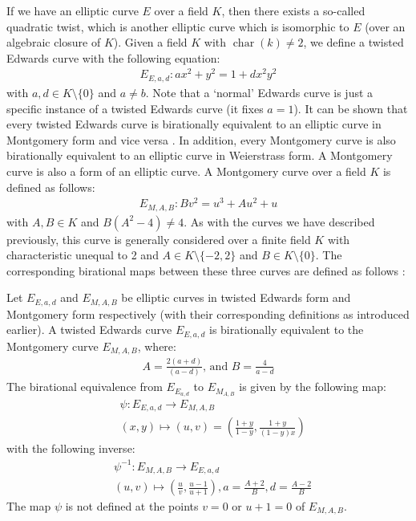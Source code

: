 If we have an elliptic curve $E$ over a field $K$, then there exists a so-called quadratic twist, which is another elliptic curve which is isomorphic to $E$ (over an algebraic closure of $K$).
Given a field $K$ with $\operatorname{char}(k) \neq 2$, we define a twisted Edwards curve with the following equation:
%
\begin{align*}
E_{E,a,d} : ax^2 + y^2 = 1 + dx^2y^2
\end{align*}
%
with $a,d \in K \setminus \{0\}$ and $a \neq b$.
Note that a `normal' Edwards curve is just a specific instance of a twisted Edwards curve (it fixes $a = 1$). 
It can be shown that every twisted Edwards curve is birationally equivalent to an elliptic curve in Montgomery form and vice versa \cite{bern2008twisted}.
In addition, every Montgomery curve is also birationally equivalent to an elliptic curve in Weierstrass form.
A Montgomery curve is also a form of an elliptic curve. 
A Montgomery curve over a field $K$ is defined as follows:
%
\begin{align*}
E_{M, A, B} : Bv^2 = u^3 + Au^2 + u
\end{align*}
%
with $A, B \in K$ and $B(A^2 - 4) \neq 4$.
As with the curves we have described previously, this curve is generally considered over a finite field $K$ with characteristic unequal to 2 and $A \in K \setminus \{-2, 2\}$ and $B \in K \setminus \{0\}$.
The corresponding birational maps between these three curves are defined as follows \cite{bern2008twisted}:
%
\begin{theorem}
	Let $E_{E,a,d}$ and $E_{M,A, B}$ be elliptic curves in twisted Edwards form and Montgomery form respectively (with their corresponding definitions as introduced earlier).
	A twisted Edwards curve $E_{E,a,d}$ is birationally equivalent to the Montgomery curve $E_{M, A, B}$, where:
	\begin{align*}
		A = \frac{2(a + d)}{(a - d)} \text{, and } B = \frac{4}{a - d}
	\end{align*}
	The birational equivalence from $E_{E_{a,d}}$ to $E_{M_{A, B}}$ is given by the following map:
	\begin{align*}
	& \psi : E_{E,a,d} \to E_{M,A,B} \\
	& (x, y) \mapsto (u,v) = \left( \frac{1 + y}{1 - y}, \frac{1 + y}{(1 - y)x}\right)
	\end{align*}
	with the following inverse:
	\begin{align*}
	& \psi^{-1} : E_{M,A, B} \to E_{E,a,d} \\
	&  (u,v) \mapsto \left(\frac{u}{v}, \frac{u - 1}{u + 1} \right), a = \frac{A + 2}{B}, d = \frac{A - 2}{B}
	\end{align*}
	The map $\psi$ is not defined at the points $v = 0$ or $u + 1 = 0$ of $E_{M,A,B}$.
\end{theorem}
